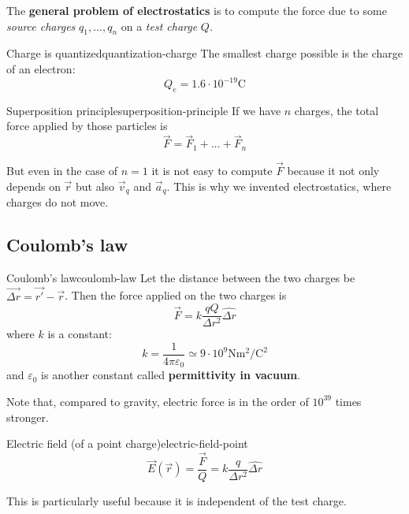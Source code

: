 \documentclass[12pt]{extarticle}
\begin{document}
The \textbf{general problem of electrostatics} is to compute the force due to some \emph{source charges} $q_1, \dots, q_n$ on a \emph{test charge} $Q$.

\begin{proposition}{Charge is quantized}{quantization-charge}
	The smallest charge possible is the charge of an electron:
	\begin{equation}
		Q_e = 1.6 \cdot 10^{-19} \si{\coulomb}
	\end{equation}
\end{proposition}

\begin{proposition}{Superposition principle}{superposition-principle}
	If we have $n$ charges, the total force applied by those particles is
	\begin{equation}
		\vec F = \vec F_1 + \dots + \vec F_n
	\end{equation}
\end{proposition}

But even in the case of $n = 1$ it is not easy to compute $\vec F$ because it not only depends on $\vec r$ but also $\vec v_q$ and $\vec a_q$.
This is why we invented electrostatics, where charges do not move.

\subsection{Coulomb's law}

\begin{theorem}{Coulomb's law}{coulomb-law}
	Let the distance between the two charges be $ \vec{\Delta r} = \vec {r'} - \vec r$.
	Then the force applied on the two charges is
	\begin{equation}
		\vec F = k \frac{qQ}{\Delta r^2} \hat{\Delta r}
	\end{equation}
	where $k$ is a constant:
	\begin{equation}
		k = \frac{1}{4\pi \varepsilon_0} \simeq 9 \cdot 10^9 \si{\newton \meter \squared \per \coulomb \squared}
	\end{equation}
	and $\varepsilon_0$ is another constant called \textbf{permittivity in vacuum}.
\end{theorem}

Note that, compared to gravity, electric force is in the order of $10^{39}$ times stronger.

\begin{definition}{Electric field (of a point charge)}{electric-field-point}
	\begin{equation}
		\vec E(\vec r) = \frac{\vec F}{Q} = k \frac{q}{\Delta r^2} \hat{\Delta r}
	\end{equation}

	This is particularly useful because it is independent of the test charge.
\end{definition}
\end{document}
